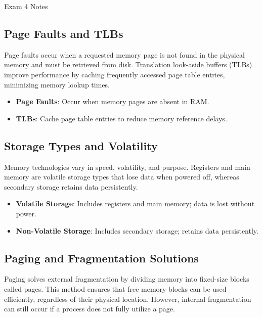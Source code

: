 \begin{examnotes}{Exam 4 Notes}
    \subsection*{Page Faults and TLBs}
    
    Page faults occur when a requested memory page is not found in the physical memory and must be retrieved from disk. Translation look-aside buffers (TLBs) improve performance by caching frequently 
    accessed page table entries, minimizing memory lookup times.
    
    \begin{highlight}
        \begin{itemize}
            \item \textbf{Page Faults}: Occur when memory pages are absent in RAM.
            \item \textbf{TLBs}: Cache page table entries to reduce memory reference delays.
        \end{itemize}
    \end{highlight}
    
    \subsection*{Storage Types and Volatility}
    
    Memory technologies vary in speed, volatility, and purpose. Registers and main memory are volatile storage types that lose data when powered off, whereas secondary storage retains data persistently.
    
    \begin{highlight}
        \begin{itemize}
            \item \textbf{Volatile Storage}: Includes registers and main memory; data is lost without power.
            \item \textbf{Non-Volatile Storage}: Includes secondary storage; retains data persistently.
        \end{itemize}
    \end{highlight}
    
    \subsection*{Paging and Fragmentation Solutions}
    
    Paging solves external fragmentation by dividing memory into fixed-size blocks called pages. This method ensures that free memory blocks can be used efficiently, regardless of their physical location. 
    However, internal fragmentation can still occur if a process does not fully utilize a page.
    

\end{examnotes}
